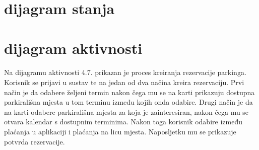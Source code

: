 \FloatBarrier


\newpage
\section{dijagram stanja}
\FloatBarrier
\section{dijagram aktivnosti}

\paragraph{}
{Na dijagramu aktivnosti 4.7. prikazan je proces kreiranja rezervacije parkinga. Korisnik se prijavi u sustav te na jedan od dva načina kreira rezervaciju. Prvi način je da odabere željeni termin nakon čega mu se na karti prikazuju dostupna parkirališna mjesta u tom terminu između kojih onda odabire. Drugi način je da na karti odabere parkirališna mjesta za koja je zainteresiran, nakon čega mu se otvara kalendar s dostupnim terminima. Nakon toga korisnik odabire između plaćanja u aplikaciji i plaćanja na licu mjesta. Naposljetku mu se prikazuje potvrda rezervacije.
}

